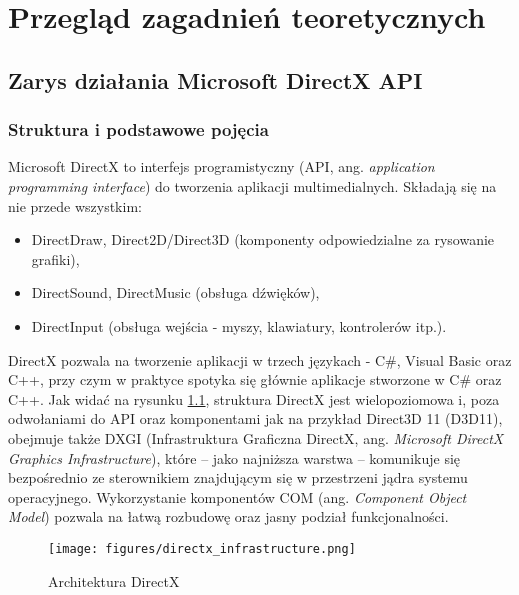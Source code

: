 
\chapter{Przegląd zagadnień teoretycznych}

\section{Zarys działania Microsoft DirectX API}

\subsection{Struktura i podstawowe pojęcia}

Microsoft DirectX to interfejs programistyczny (API, ang. \emph{application programming interface}) do tworzenia aplikacji multimedialnych. Składają się na nie przede wszystkim:

\begin{itemize}
\item DirectDraw, Direct2D/Direct3D (komponenty odpowiedzialne za rysowanie grafiki),
\item DirectSound, DirectMusic (obsługa dźwięków),
\item DirectInput (obsługa wejścia - myszy, klawiatury, kontrolerów itp.).
\end{itemize}

DirectX pozwala na tworzenie aplikacji w trzech językach - C\#, Visual Basic oraz C++, przy czym w praktyce spotyka się głównie aplikacje stworzone w C\# oraz C++.
Jak widać na rysunku \ref{directx_infrastructure}, struktura DirectX jest wielopoziomowa i, poza odwołaniami do API oraz komponentami jak na przykład Direct3D 11 (D3D11), obejmuje także DXGI (Infrastruktura Graficzna DirectX, ang. \emph{Microsoft DirectX Graphics Infrastructure}), które -- jako najniższa warstwa -- komunikuje się bezpośrednio ze sterownikiem znajdującym się w przestrzeni jądra systemu operacyjnego. Wykorzystanie komponentów COM (ang. \emph{Component Object Model}) pozwala na łatwą rozbudowę oraz jasny podział funkcjonalności.\\
\begin{figure}
\begin{center}
\texttt{[image: figures/directx\_infrastructure.png]}
\caption{Architektura DirectX}
\label{directx_infrastructure}
\end{center}
\end{figure}

